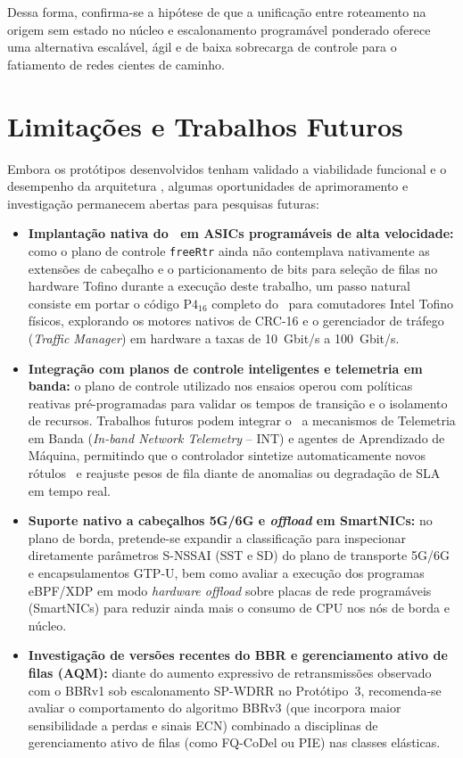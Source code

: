 Dessa forma, confirma-se a hipótese de que a unificação entre roteamento na origem sem estado no núcleo e escalonamento programável ponderado oferece uma alternativa escalável, ágil e de baixa sobrecarga de controle para o fatiamento de redes cientes de caminho.

\section{Limitações e Trabalhos Futuros}
\label{sec:trabalhos_futuros}

Embora os protótipos desenvolvidos tenham validado a viabilidade funcional e o desempenho da arquitetura \nome, algumas oportunidades de aprimoramento e investigação permanecem abertas para pesquisas futuras:

\begin{itemize}
    \item \textbf{Implantação nativa do \nome\ em ASICs programáveis de alta velocidade:} como o plano de controle \texttt{freeRtr} ainda não contemplava nativamente as extensões de cabeçalho e o particionamento de bits para seleção de filas no hardware Tofino durante a execução deste trabalho, um passo natural consiste em portar o código $\text{P4}_{16}$ completo do \nome\ para comutadores Intel Tofino físicos, explorando os motores nativos de CRC-16 e o gerenciador de tráfego (\textit{Traffic Manager}) em hardware a taxas de 10~Gbit/s a 100~Gbit/s.
    \item \textbf{Integração com planos de controle inteligentes e telemetria em banda:} o plano de controle utilizado nos ensaios operou com políticas reativas pré-programadas para validar os tempos de transição e o isolamento de recursos. Trabalhos futuros podem integrar o \nome\ a mecanismos de Telemetria em Banda (\textit{In-band Network Telemetry} -- INT) e agentes de Aprendizado de Máquina, permitindo que o controlador sintetize automaticamente novos rótulos \routeID\ e reajuste pesos de fila diante de anomalias ou degradação de SLA em tempo real.
    \item \textbf{Suporte nativo a cabeçalhos 5G/6G e \textit{offload} em SmartNICs:} no plano de borda, pretende-se expandir a classificação para inspecionar diretamente parâmetros S-NSSAI (SST e SD) do plano de transporte 5G/6G e encapsulamentos GTP-U, bem como avaliar a execução dos programas eBPF/XDP em modo \textit{hardware offload} sobre placas de rede programáveis (SmartNICs) para reduzir ainda mais o consumo de CPU nos nós de borda e núcleo.
    \item \textbf{Investigação de versões recentes do BBR e gerenciamento ativo de filas (AQM):} diante do aumento expressivo de retransmissões observado com o BBRv1 sob escalonamento SP-WDRR no Protótipo~3, recomenda-se avaliar o comportamento do algoritmo BBRv3 (que incorpora maior sensibilidade a perdas e sinais ECN) combinado a disciplinas de gerenciamento ativo de filas (como FQ-CoDel ou PIE) nas classes elásticas.
\end{itemize}